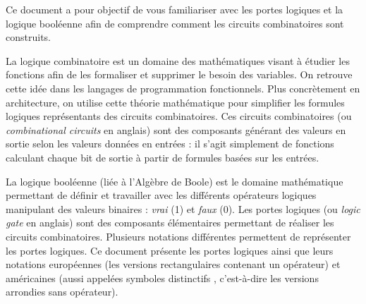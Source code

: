 \documentclass[11pt,a4paper]{article}
\begin{document}
\EncadreTitre

\bigskip


%
%

\bigskip


Ce document a pour objectif de vous familiariser avec les portes logiques et la logique booléenne afin de comprendre comment les circuits combinatoires sont construits.

\bigskip

La logique combinatoire est un domaine des mathématiques visant à étudier les fonctions afin de les formaliser et supprimer le besoin des variables.
On retrouve cette idée dans les langages de programmation fonctionnels.
Plus concrètement en architecture, on utilise cette théorie mathématique pour simplifier les formules logiques représentants des circuits combinatoires.
Ces circuits combinatoires (ou \textit{combinational circuits} en anglais) sont des composants générant des valeurs en sortie selon les valeurs données en entrées : il s'agit simplement de fonctions calculant chaque bit de sortie à partir de formules basées sur les entrées.

\medskip

La logique booléenne (liée à l'Algèbre de Boole) est le domaine mathématique permettant de définir et travailler avec les différents opérateurs logiques manipulant des valeurs binaires : \textit{vrai} (1) et \textit{faux} (0).
Les portes logiques (ou \textit{logic gate} en anglais) sont des composants élémentaires permettant de réaliser les circuits combinatoires. %
%
%
Plusieurs notations différentes permettent de représenter les portes logiques.
Ce document présente les portes logiques ainsi que leurs notations européennes (les versions rectangulaires contenant un opérateur) et américaines (aussi appelées \og symboles distinctifs \fg{}, c'est-à-dire les versions arrondies sans opérateur).
\end{document}
